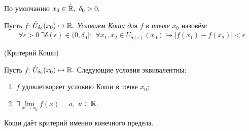 \begin{note} 
    По умолчанию $x_0 \in \Hat{\mathbb{R}},\  \delta_{0} > 0.$
\end{note}
 Пусть $f$: $\mathring{U}_{\delta_0} (x_0)  \mapsto \mathbb{R}.$ \textit{Условием Коши для $f$ в точке} $x_0$ назовём:
 \[ 
 \forall \epsilon>0 \ \exists \delta(\epsilon) \in (0, \delta_{0}]: \ \  
 \forall x_{1}, x_{2} \in \mathring{U}_{\delta (\epsilon)} (x_0) \hookrightarrow | f(x_1) - f(x_2)| < \epsilon
 \]

 \begin{theorem}
     \hypertarget{thm4.3}{(Критерий Коши)} Пусть $f$: $\mathring{U}_{\delta_0} (x_0)  \mapsto \mathbb{R}.$ Следующие условия эквивалентны:
     \begin{enumerate}
         \item $f$ удовлетворяет условию Коши в точке $x_0$;
         \item $\exists \lim\limits_{x\to x_{0}} f (x) = a,$ $a \in \mathbb{R}$.
     \end{enumerate}
 \end{theorem}
\begin{note}
    Коши даёт критерий именно конечного предела.
\end{note}
